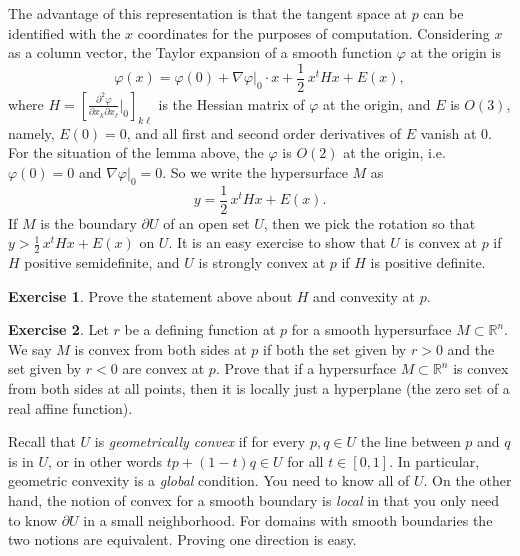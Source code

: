 \documentclass[12pt,openany]{book}
\newcommand{\R}{{\mathbb{R}}}
\newcommand{\myindex}[1]{#1\index{#1}}
\theoremstyle{plain}
\theoremstyle{remark}
\theoremstyle{definition}
\newenvironment{exbox}{%
    \def\FrameCommand{\vrule width 1pt \relax\hspace{10pt}}%
    \MakeFramed{\advance\hsize-\width\FrameRestore}%
}{%
    \endMakeFramed
}
\theoremstyle{exercise}
\newtheorem{exercise}{Exercise}[section]
\theoremstyle{example}
\begin{document}
The advantage of this representation is that the tangent space at $p$
can be identified with the $x$ coordinates for the purposes of computation.
Considering $x$ as a column vector, the Taylor expansion of a smooth function $\varphi$ at the origin is
\begin{equation*}
\varphi(x) = \varphi(0) + \nabla \varphi|_0 \cdot x + \frac{1}{2}\, x^t H x + E(x) ,
\end{equation*}
where $H = \left[
\frac{\partial^2 \varphi}{\partial x_k \partial x_\ell} \big|_{0} \right]_{k\ell}$
is the Hessian matrix of $\varphi$ at the origin,
and $E$ is $O(3)$, namely, $E(0) = 0$, and
all first and second order derivatives of $E$ vanish at $0$.
For the situation of the lemma above,
the $\varphi$ is $O(2)$ at the origin, i.e.\ $\varphi(0) = 0$
and $\nabla \varphi|_0 = 0$.  So we write the hypersurface
$M$ as
\begin{equation*}
y = \frac{1}{2}\, x^t H x + E(x) .
\end{equation*}
If $M$ is the boundary
$\partial U$ of an open set $U$, then
we pick the rotation so that $y > \frac{1}{2}\,x^t H x + E(x)$ on $U$.
It is an easy exercise to show that $U$ is convex at $p$ if
$H$ positive semidefinite, and $U$ is strongly convex at $p$ if $H$ is positive definite.

\begin{exbox}
\begin{exercise}
Prove the statement above about $H$ and convexity at $p$.
\end{exercise}

\begin{exercise}
Let $r$ be a defining function at $p$ for a smooth hypersurface
$M \subset \R^n$.
We say $M$ is convex from both sides at $p$ if both the set given by
$r > 0$ and the set given by $r < 0$ are convex at $p$.
Prove that if a hypersurface $M \subset \R^n$ is convex from both sides at all
points, then it is locally just a hyperplane (the zero set of a real affine
function).
\end{exercise}
\end{exbox}

Recall that $U$ is
\emph{\myindex{geometrically convex}}
if for every $p,q \in U$ the
line between $p$ and $q$ is in $U$, or in other words
$tp +(1-t)q \in U$ for all $t \in [0,1]$.
In particular, geometric convexity is a \emph{global} condition.  You need
to know all of $U$.  On the other hand, the notion of convex for a smooth boundary is
\emph{local} in that you only need to know $\partial U$ in a small
neighborhood.  For domains with
smooth boundaries the two notions are equivalent.  Proving
one direction is easy.
\end{document}
